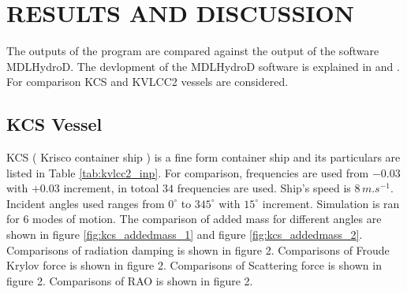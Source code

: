 \chapter{RESULTS AND DISCUSSION}
The outputs of the program are compared against the output of the software MDLHydroD. The devlopment of the 
MDLHydroD software is explained in \cite{guha2013development} and \cite{guha2015estimation}.
For comparison KCS and KVLCC2 vessels are considered. 

\section{KCS Vessel}
KCS ( Krisco container ship ) is a fine form container ship and its particulars are listed in Table \ref{tab:kvlcc2_inp}. For comparison, frequencies are used from
$-0.03$ with $+0.03$ increment, in totoal $34$ frequencies are used. Ship's speed is $8\,\si{m.s^{-1}}$. Incident angles used 
ranges from $0^{\circ}$ to $345^{\circ}$ with $15^{\circ}$ increment. Simulation is ran for 6 modes of motion.  
The comparison of added mass for different angles are shown in figure \ref{fig:kcs_addedmass_1} and figure \ref{fig:kcs_addedmass_2}.
Comparisons of radiation damping is shown in figure 2. Comparisons of Froude Krylov force is shown in figure 2.
Comparisons of Scattering force is shown in figure 2. Comparisons of RAO is shown in figure 2.

\begin{table}[tbp]
    \caption[Table]{KCS principal particulars\label{tab:kcs_particulars}}
\end{table}

